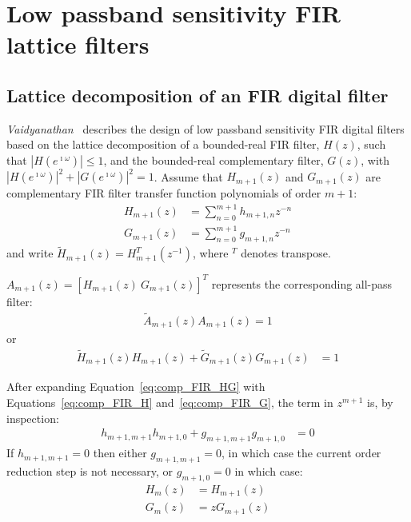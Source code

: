 \documentclass[a4paper,twoside,10pt,english]{report}
\begin{document}
\chapter{\label{app:Low-passband-sensitivity-FIR-digital-filters}Low passband sensitivity FIR lattice filters}
\section{\label{app:Lattice-decomposition-of-FIR-digital-filters}Lattice decomposition of an FIR digital filter}
\emph{Vaidyanathan}~\cite{Vaidyanathan_PassiveCascadedLatticeFIR} describes the
design of low passband sensitivity FIR digital filters based on the lattice
decomposition of a bounded-real FIR filter, $H\left(z\right)$, such that
$\left|H\left(e^{\imath\omega}\right)\right|\le 1$, and the bounded-real
complementary filter, $G\left(z\right)$, with
$\left|H\left(e^{\imath\omega}\right)\right|^{2}+\left|G\left(e^{\imath\omega}\right)\right|^{2}=1$. Assume that $H_{m+1}\left(z\right)$ and $G_{m+1}\left(z\right)$ are
complementary FIR filter transfer function polynomials of order $m+1$:
\begin{align}
  H_{m+1}\left(z\right) &= \sum_{n=0}^{m+1}h_{m+1,n}z^{-n} \label{eq:comp_FIR_H}\\
  G_{m+1}\left(z\right) &= \sum_{n=0}^{m+1}g_{m+1,n}z^{-n} \label{eq:comp_FIR_G}
\end{align}
and write $\tilde{H}_{m+1}\left(z\right)=H^{T}_{m+1}\left(z^{-1}\right)$, where
$^{T}$ denotes transpose.

$A_{m+1}\left(z\right)=\left[H_{m+1}\left(z\right)~G_{m+1}\left(z\right)\right]^{T}$
represents the corresponding all-pass filter:
\begin{align*}
  \tilde{A}_{m+1}\left(z\right)A_{m+1}\left(z\right)=1
\end{align*}
or
\begin{align}
  \tilde{H}_{m+1}\left(z\right) H_{m+1}\left(z\right) +
  \tilde{G}_{m+1}\left(z\right) G_{m+1}\left(z\right) &= 1 \label{eq:comp_FIR_HG}
\end{align}

After expanding Equation~\ref{eq:comp_FIR_HG} with Equations~\ref{eq:comp_FIR_H}
and~\ref{eq:comp_FIR_G}, the term in $z^{m+1}$ is, by inspection:
\begin{align}
  h_{m+1,m+1}h_{m+1,0}+g_{m+1,m+1}g_{m+1,0} &= 0 \label{eqn:eq:comp_FIR_alt_reduction}
\end{align}
If $h_{m+1,m+1}=0$ then either $g_{m+1,m+1}=0$, in which case the current
order reduction step is not necessary, or $g_{m+1,0}=0$ in which case:
\begin{align*}
H_{m}\left(z\right) &= H_{m+1}\left(z\right)\\
G_{m}\left(z\right) &= zG_{m+1}\left(z\right)
\end{align*}
\end{document}
